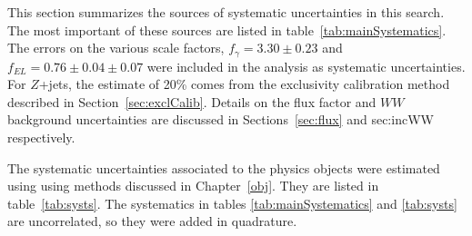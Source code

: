 \par This section summarizes the sources of systematic uncertainties in this search. 
The most important of these sources are listed in table~\ref{tab:mainSystematics}.
The errors on the various scale factors, $f_{\gamma} = 3.30 \pm 0.23$
and $f_{EL} = 0.76 \pm 0.04 \pm 0.07$  
were included in the analysis as systematic uncertainties. 
For $Z$+jets, the estimate of 20\% comes from the exclusivity  
calibration method described in Section~\ref{sec:exclCalib}. Details on the 
flux factor and $WW$ background uncertainties are discussed in Sections~\ref{sec:flux} and {sec:incWW}
respectively. 

\begin{table}[!h]
 \centering
 \caption{Most important sources of systematic uncertainties and their contribution
          to the event yields. The largest ones come from estimates of background. 
          Dashed lines imply that the source was not directly applicable to 
          that particular process.}
 \label{tab:mainSystematics}
\end{table}

\par The systematic uncertainties associated to the physics objects were estimated using 
using methods discussed in Chapter~\ref{obj}. They are listed in table~\ref{tab:systs}. 
 The systematics in tables 
\ref{tab:mainSystematics} and \ref{tab:systs} are uncorrelated, so they 
were added in quadrature.

